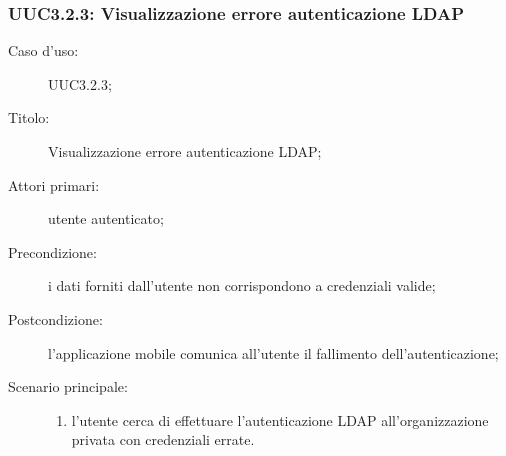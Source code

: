 \documentclass[../../../analisi-dei-requisiti.tex]{subfiles}
\begin{document}
\subsubsection{UUC3.2.3: Visualizzazione errore autenticazione LDAP}%
\label{subs:UUC3.2.3}
\begin{description}
  \item[Caso d’uso:] UUC3.2.3;
  \item[Titolo:] Visualizzazione errore autenticazione LDAP\@;
  \item[Attori primari:] utente autenticato;
  \item[Precondizione:] i dati forniti dall'utente non corrispondono a credenziali valide;
  \item[Postcondizione:] l'applicazione mobile comunica all'utente il fallimento dell'autenticazione;
  \item[Scenario principale:]
        \begin{enumerate}
          \item l'utente cerca di effettuare l'autenticazione LDAP all'organizzazione privata con credenziali errate.
        \end{enumerate}
\end{description}
\end{document}
